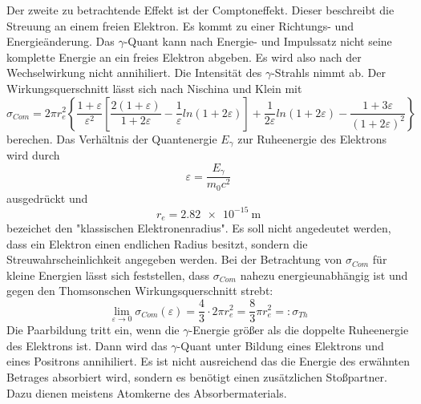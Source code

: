 Der zweite zu betrachtende Effekt ist der Comptoneffekt.
Dieser beschreibt die Streuung an einem freien Elektron.
Es kommt zu einer Richtungs- und Energieänderung.
Das $\gamma$-Quant kann nach Energie- und Impulssatz nicht seine komplette Energie an ein freies Elektron abgeben.
Es wird also nach der Wechselwirkung nicht annihiliert.
Die Intensität des $\gamma$-Strahls nimmt ab.
Der Wirkungsquerschnitt lässt sich nach Nischina und Klein mit
\begin{equation}
    \label{eq:klein}
  \sigma_{Com} = 2 \pi r_e^2 \left\{\frac{1+\varepsilon}{\varepsilon^2}\left[\frac{2(1+\varepsilon)}{1+2\varepsilon} - \frac{1}{\varepsilon}ln(1+2\varepsilon)\right] + \frac{1}{2\varepsilon}ln(1+2\varepsilon) - \frac{1+3\varepsilon}{(1+2\varepsilon)^2} \right\}
\end{equation}
berechen.
Das Verhältnis der Quantenergie $E_\gamma$ zur Ruheenergie des Elektrons wird durch
\begin{equation}
  \varepsilon = \frac{E_\gamma}{m_0 c^2}
\end{equation}
ausgedrückt und
\begin{equation}
  r_e= \SI{2.82e-15}{\meter}
\end{equation}
bezeichet den "klassischen Elektronenradius".
Es soll nicht angedeutet werden, dass ein Elektron einen endlichen Radius besitzt, sondern die Streuwahrscheinlichkeit angegeben werden.
Bei der Betrachtung von $\sigma_{Com}$ für kleine Energien lässt sich feststellen, dass $\sigma_{Com}$ nahezu energieunabhängig ist und gegen den Thomsonschen Wirkungsquerschnitt strebt:
\begin{equation}
  \lim_{\varepsilon \rightarrow 0} \sigma_{Com}(\varepsilon) = \frac{4}{3} \cdot 2 \pi r_e^2 = \frac{8}{3}\pi r_e^2 =: \sigma_{Th}
\end{equation}
Die Paarbildung tritt ein, wenn die $\gamma$-Energie größer als die doppelte Ruheenergie des Elektrons ist.
Dann wird das $\gamma$-Quant unter Bildung eines Elektrons und eines Positrons annihiliert.
Es ist nicht ausreichend das die Energie des erwähnten Betrages absorbiert wird, sondern es benötigt einen zusätzlichen Stoßpartner.
Dazu dienen meistens Atomkerne des Absorbermaterials.
%
